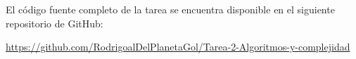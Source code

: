 

El código fuente completo de la tarea se encuentra disponible en el siguiente repositorio de GitHub:

\url{https://github.com/RodrigoalDelPlanetaGol/Tarea-2-Algoritmos-y-complejidad}